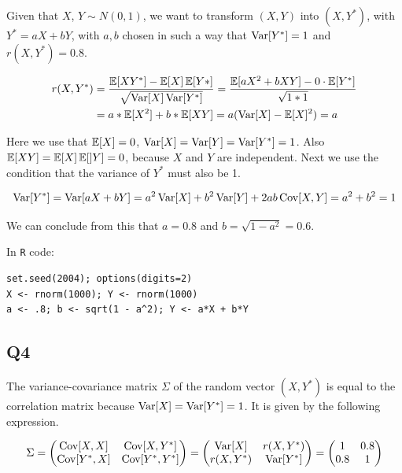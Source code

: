 Given that $X$, $Y \sim N(0,1)$, we want to transform $(X, Y)$ into $(X, Y^*)$, with $Y^* = aX + bY$, with $a, b$ chosen in such a way that $\operatorname{\text{Var}}[Y^*] = 1$ and $r(X, Y^*) = 0.8$.

\begin{align}
r(X, Y^*) & = \frac{\operatorname{\mathbb{E}}[X Y^*] - \operatorname{\mathbb{E}}[X] \operatorname{\mathbb{E}}[Y*]}{\sqrt{\operatorname{\text{Var}}[X] \operatorname{\text{Var}}[Y^*]}} = \frac{\operatorname{\mathbb{E}}[a X^2 + b X Y] - 0 \cdot \operatorname{\mathbb{E}}[Y^*]}{\sqrt{1 * 1}} \\
          & = a * \operatorname{\mathbb{E}}[X^2] + b * \operatorname{\mathbb{E}}[X Y] = a (\operatorname{\text{Var}}[X] - \operatorname{\mathbb{E}}[X]^2) = a
\end{align}

Here we use that $\operatorname{\mathbb{E}}[X] = 0$, $\operatorname{\text{Var}}[X] = \operatorname{\text{Var}}[Y] = \operatorname{\text{Var}}[Y^*] = 1$. Also $\operatorname{\mathbb{E}}[X Y] = \operatorname{\mathbb{E}}[X] \operatorname{\mathbb{E}}[]Y] = 0$, because $X$ and $Y$ are independent.
Next we use the condition that the variance of $Y^*$ must also be 1.

\begin{equation}
\operatorname{\text{Var}}[Y^*] = \operatorname{\text{Var}}[aX + bY] = a^2 \operatorname{\text{Var}}[X] + b^2 \operatorname{\text{Var}}[Y] + 2ab \operatorname{\text{Cov}}[X,Y] = a^2 + b^2 = 1
\end{equation}

We can conclude from this that $a = 0.8$ and $b = \sqrt{1 - a^2} = 0.6$.

In \verb|R| code:

\begin{verbatim}
set.seed(2004); options(digits=2)
X <- rnorm(1000); Y <- rnorm(1000)
a <- .8; b <- sqrt(1 - a^2); Y <- a*X + b*Y
\end{verbatim}

\subsection*{Q4}

The variance-covariance matrix $\Sigma$ of the random vector $(X, Y^*)$ is equal to the correlation matrix because $\operatorname{\text{Var}}[X] = \operatorname{\text{Var}}[Y^*] = 1$. It is given by the following expression.

\begin{equation}
\Sigma = 
\begin{pmatrix}
\operatorname{\text{Cov}}[X,X] & \operatorname{\text{Cov}}[X, Y^*] \\
\operatorname{\text{Cov}}[Y^*,X] & \operatorname{\text{Cov}}[Y^*, Y^*]
\end{pmatrix}
=
\begin{pmatrix}
\operatorname{\text{Var}}[X] & r(X,Y^*) \\
r(X, Y^*) & \operatorname{\text{Var}}[Y^*]
\end{pmatrix}
=
\begin{pmatrix}
1 & 0.8 \\
0.8 & 1
\end{pmatrix}
\end{equation}

